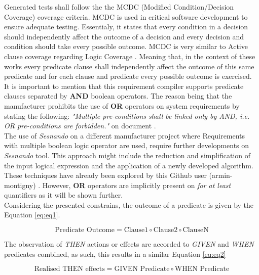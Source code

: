 Generated tests shall follow the the MCDC (Modified Condition/Decision Coverage) coverage criteria. MCDC is used in critical software development to ensure adequate testing. Essentialy, it states that every condition in a decision should independently affect the outcome of a decision and every decision and condition should take every possible outcome. MCDC is very similar to Active clause coverage regarding Logic Coverage \cite{intro_sw_testing}.
Meaning that, in the context of these works every predicate clause shall independently affect the outcome of this same predicate and for each clause and predicate every possible outcome is exercised.\\

It is important to mention that this requirement compiler supports predicate clauses separated by \textbf{AND} boolean operators. The reason being that the manufacturer prohibits the use of \textbf{OR} operators on system requirements by stating the following: \textit{"Multiple pre-conditions shall be linked only by AND, i.e. OR pre-conditions are forbidden."} on document \cite{tcms_req_guidelines}.\\

The use of \textit{Sesnando} on a different manufacturer project where Requirements with multiple boolean logic operator are used, require further developments on \textit{Sesnando} tool. This approach might include the reduction and simplification of the input logical expression and the application of a newly developed algorithm. These techniques have already been explored by this Github user (armin-montigny) \cite{armin-montigny_evaluation_2022}. However, \textbf{OR} operators are implicitly present on \textit{for at least} quantifiers as it will be shown further.\\

Considering the presented constrains, the outcome of a predicate is given by the Equation \ref{eq:eq1}.

\begin{equation}
    \text{Predicate Outcome} = \text{Clause1} \circ \text{Clause2} \circ \text{ClauseN}
    \label{eq:eq1}
\end{equation}


The observation of \textit{THEN} actions or effects are accorded to \textit{GIVEN} and \textit{WHEN} predicates combined, as such, this results in a similar Equation \ref{eq:eq2}

\begin{equation}
    \text{Realised THEN effects} = \text{GIVEN Predicate} \circ \text{WHEN Predicate}
    \label{eq:eq2}
\end{equation}


